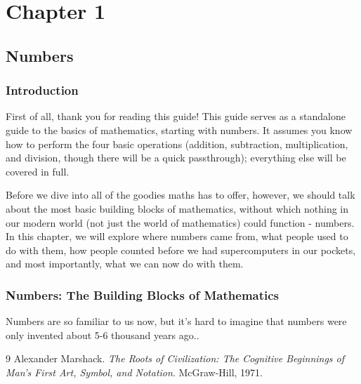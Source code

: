 \documentclass{article}
\begin{document}
    \section*{Chapter 1}
    \subsection*{Numbers}

    \subsubsection{Introduction}
    \par
    First of all, thank you for reading this guide!
    \newline
    This guide serves as a standalone guide to the basics of mathematics, starting with numbers. 
    It assumes you know how to perform the four basic operations (addition, subtraction, multiplication, and division, though there will be a quick passthrough); everything else will be covered in full.
    \par

    Before we dive into all of the goodies maths has to offer, however, we should talk about the most basic building blocks of mathematics, without which nothing in our modern world (not just the world of mathematics) could function - numbers.
    \newline
    In this chapter, we will explore where numbers came from, what people used to do with them, how people counted before we had supercomputers in our pockets, and most importantly, what we can now do with them.

    \subsubsection{Numbers: The Building Blocks of Mathematics}
    \par
    Numbers are so familiar to us now, but it's hard to imagine that numbers were only invented about 5-6 thousand years ago.\cite{marshack1971}.
    
    \begin{thebibliography}{9}
        Alexander Marshack.
        \textit{The Roots of Civilization: The Cognitive Beginnings of Man's First Art, Symbol, and Notation}.
        McGraw-Hill, 1971.
    \end{thebibliography}
\end{document}
